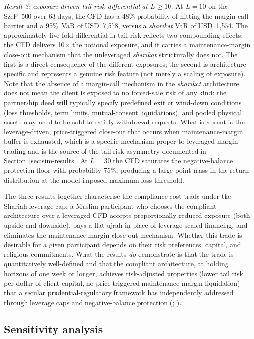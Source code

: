 \documentclass[preprint,12pt,authoryear]{elsarticle}
\theoremstyle{definition}
\begin{document}
\emph{Result 3: exposure-driven tail-risk differential at $L \geq
10$.} At $L = 10$ on the S\&P~500 over 63 days, the CFD has a 48\%
probability of hitting the margin-call barrier and a 95\%~VaR of
USD~7{,}578, versus a \emph{shar\={\i}kat} VaR of USD~1{,}554. The
approximately five-fold differential in tail risk reflects two
compounding effects: the CFD delivers 10$\times$ the notional
exposure, and it carries a maintenance-margin close-out mechanism
that the unleveraged \emph{shar\={\i}kat} structurally does not.
The first is a direct consequence of the different exposures; the
second is architecture-specific and represents a genuine risk
feature (not merely a scaling of exposure). Note that the
absence of a margin-call mechanism in the \emph{shar\={\i}kat}
architecture does not mean the client is exposed to no forced-sale
risk of any kind: the partnership deed will typically specify
predefined exit or wind-down conditions (loss thresholds, term
limits, mutual-consent liquidations), and pooled physical assets
may need to be sold to satisfy withdrawal requests. What is
absent is the leverage-driven, price-triggered close-out that
occurs when maintenance-margin buffer is exhausted, which is a
specific mechanism proper to leveraged margin trading and is the
source of the tail-risk asymmetry documented in
Section~\ref{sec:sim-results}.
At $L = 30$ the CFD
saturates the negative-balance protection floor with probability
75\%, producing a large point mass in the return distribution at
the model-imposed maximum-loss threshold.

The three results together characterise the compliance-cost trade
under the Shariah leverage cap: a Muslim participant who chooses
the compliant architecture over a leveraged CFD accepts
proportionally reduced exposure (both upside and downside), pays
a flat ujrah in place of leverage-scaled financing, and eliminates
the maintenance-margin close-out mechanism. Whether this trade is desirable for a given
participant depends on their risk preferences, capital, and
religious commitments. What the results \emph{do} demonstrate is
that the trade is quantitatively well-defined and that the
compliant architecture, at holding horizons of one week or
longer, achieves risk-adjusted properties (lower tail risk per
dollar of client capital, no price-triggered maintenance-margin
liquidation) that a secular prudential-regulatory framework has
independently addressed through leverage caps and negative-balance
protection (\citealp{HeimerSimsek2019}; \citealp{ASIC2020}).

\subsection{Sensitivity analysis}
\label{sec:sim-sensitivity}
\end{document}
